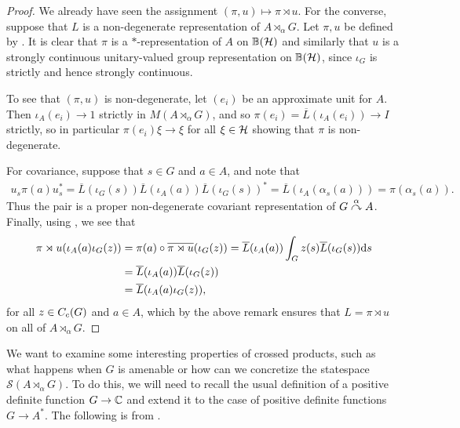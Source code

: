 \begin{proof}
	We already have seen the assignment $(\pi,u) \mapsto \pi \rtimes u$. For the converse, suppose that $L$ is a non-degenerate representation of $A \rtimes_\alpha G$. Let $\pi, u$ be defined by . It is clear that $\pi$ is a $*$-representation of $A$ on $\mathbb{B}(\mathcal{H})$ and similarly that $u$ is a strongly continuous unitary-valued group representation on $\mathbb{B}(\mathcal{H})$, since $\iota_G$ is strictly and hence strongly continuous. 
	
	To see that $(\pi,u)$ is non-degenerate, let $(e_i)$ be an approximate unit for $A$. Then $\iota_A(e_i) \to 1$ strictly in $M(A \rtimes_\alpha G)$, and so $\pi(e_i) = \overline L(\iota_A(e_i)) \to I$ strictly, so in particular $\pi(e_i) \xi \to \xi$ for all $\xi \in \mathcal{H}$ showing that $\pi$ is non-degenerate. 
	
	For covariance, suppose that $s \in G$ and $a \in A$, and note that
\begin{align*}
	u_s \pi(a) u_s^* = \overline L(\iota_G(s) ) \overline L (\iota_A(a)) \overline L(\iota_G(s))^* = \overline L( \iota_A(\alpha_s(a))) = \pi(\alpha_{s}(a)).
\end{align*}
Thus the pair is a proper non-degenerate covariant representation of $G \stackrel{\alpha}{\curvearrowright} A$. Finally, using , we see that
\begin{align*}
\pi \rtimes u(\iota_A(a) \iota_G(z)) &= \pi(a) \circ \overline{\pi \rtimes u}(\iota_G(z)) = \overline L(\iota_A(a)) \int_G z(s) \overline L(\iota_G(s)) \mathrm{d} s \\
&= \overline L(\iota_A(a)) \overline L(\iota_G(z)) \\
&= \overline L(\iota_A(a) \iota_G(z)),
\end{align*}
for all $z \in C_c(G)$ and $a \in A$, which by the above remark ensures that $L = \pi \rtimes u$ on all of $A \rtimes_ \alpha G$.
\end{proof}

We want to examine some interesting properties of crossed products, such as what happens when $G$ is amenable or how can we concretize the statespace $\mathcal{S}(A\rtimes_\alpha G)$. To do this, we will need to recall the usual definition of a positive definite function $G \to \mathbb{C}$ and extend it to the case of positive definite functions $G \to A^*$. The following is from \cite{pedersenalgauto}.

